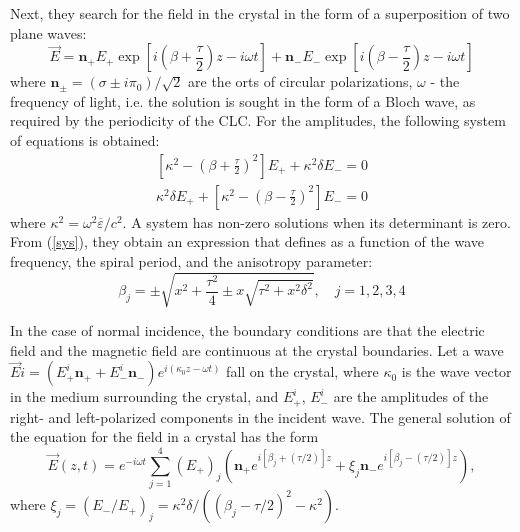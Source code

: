 \documentclass[a4paper, 12pt]{article}
\renewcommand{\epsilon}{\varepsilon}
\begin{document}
Next, they search for the field in the crystal in the form of a superposition of two plane waves:
\begin{equation}
\overrightarrow{E}=\mathbf{n}_{+} E_{+} \exp \left[i\left(\beta+\frac{\tau}{2}\right) z-i \omega t\right]+\mathbf{n}_{-} E_{-} \exp \left[i\left(\beta-\frac{\tau}{2}\right) z-i \omega t\right]
\end{equation}
where $\mathbf{n}_{\pm}=\left(\sigma \pm i \pi_{0}\right) / \sqrt{2}$ are the orts of circular polarizations, $\omega$ - the frequency of light, i.e. the solution is sought in the form of a Bloch wave, as required by the periodicity of the CLC. For the amplitudes, the following system of equations is obtained:
\begin{equation}\label{sys}
\begin{array}{l}
{\left[\kappa^{2}-\left(\beta+\frac{\tau}{2}\right)^{2}\right] E_{+}+\kappa^{2} \delta E_{-}=0} \\
\kappa^{2} \delta E_{+}+\left[\kappa^{2}-\left(\beta-\frac{\tau}{2}\right)^{2}\right] E_{-}=0
\end{array}
\end{equation}
where $\kappa^{2} = \omega^{2} \overline{\epsilon} / c^{2}$. A system has non-zero solutions when its determinant is zero.
From (\ref{sys}), they obtain an expression that defines as a function of the wave frequency, the spiral period, and the anisotropy parameter:
\begin{equation}\label{sol}
\beta_{j}=\pm \sqrt{x^{2}+\frac{\tau^{2}}{4} \pm x \sqrt{\tau^{2}+x^{2} \delta^{2}}}, \quad j=1,2,3,4
\end{equation}

In the case of normal incidence, the boundary conditions are that the electric field and the magnetic field are continuous at the crystal boundaries. Let a wave $\overrightarrow{E} i=\left(E_{+}^{i} \mathbf{n}_{+}+E_{-}^{i} \mathbf{n}_{-}\right) e^{i\left(\kappa_{0} z-\omega t\right)}$ fall on the crystal, where $\kappa_{0}$ is the wave vector in the medium surrounding the crystal, and $E_{+}^{i}$, $E_{-}^{i}$ are the amplitudes of the right- and left-polarized components in the incident wave. The general solution of the equation for the field in a crystal has the form 
\begin{equation}
\overrightarrow{E}(z, t)=e^{-i \omega t} \sum_{j=1}^{4}\left(E_{+}\right)_{j}\left(\mathbf{n}_{+} e^{i\left[\beta_{j}+(\tau / 2)\right] z}+\xi_{j} \mathbf{n}_{-} e^{i\left[\beta_{j}-(\tau / 2)\right]z}\right),
\end{equation}
where $\xi_{j} = (E_{-}/E_{+})_{j} = \kappa^{2} \delta / ((\beta_{j} - \tau/2)^{2} - \kappa^{2})$.
\end{document}
